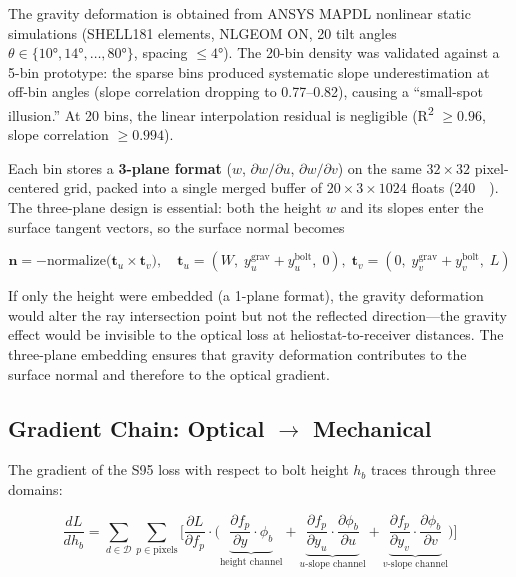 \documentclass{CVM}
\begin{document}
The gravity deformation is obtained from ANSYS MAPDL nonlinear static
simulations (SHELL181 elements, NLGEOM ON, 20 tilt angles
$\theta \in \{10\si{\degree}, 14\si{\degree}, \dots, 80\si{\degree}\}$,
spacing $\le 4\si{\degree}$). The 20-bin density was validated against a
5-bin prototype: the sparse bins produced systematic slope underestimation at
off-bin angles (slope correlation dropping to 0.77--0.82), causing a
``small-spot illusion.'' At 20 bins, the linear interpolation residual is
negligible (R\textsuperscript{2} $\ge 0.96$, slope correlation $\ge 0.994$).

Each bin stores a \textbf{3-plane format}
($w$, $\partial w/\partial u$, $\partial w/\partial v$) on the same
$32\times32$ pixel-centered grid, packed into a single merged buffer of
$20 \times 3 \times 1024$ floats (\SI{240}{\kilo\byte}). The three-plane
design is essential: both the height $w$ and its slopes enter the surface
tangent vectors, so the surface normal becomes

\begin{equation}
\mathbf{n} = -\text{normalize}\big(
\mathbf{t}_u \times \mathbf{t}_v\big),\quad
\mathbf{t}_u = (W,\; y_u^{\text{grav}} + y_u^{\text{bolt}},\; 0),\;
\mathbf{t}_v = (0,\; y_v^{\text{grav}} + y_v^{\text{bolt}},\; L)
\label{eq:normal}
\end{equation}

If only the height were embedded (a 1-plane format), the gravity deformation
would alter the ray intersection point but not the reflected direction---the
gravity effect would be invisible to the optical loss at heliostat-to-receiver
distances. The three-plane embedding ensures that gravity deformation
contributes to the surface normal and therefore to the optical gradient.

\subsection{Gradient Chain: Optical $\rightarrow$ Mechanical}

The gradient of the S95 loss with respect to bolt height $h_b$ traces through
three domains:

\begin{equation}
\frac{dL}{dh_b} = \sum_{d\in\mathcal{D}}\sum_{p\in\text{pixels}}
\Bigg[
\frac{\partial L}{\partial f_p} \cdot \Bigg(
\underbrace{\frac{\partial f_p}{\partial y} \cdot \phi_b}_{\text{height channel}}
+ \underbrace{\frac{\partial f_p}{\partial y_u} \cdot \frac{\partial \phi_b}{\partial u}}_{\text{$u$-slope channel}}
+ \underbrace{\frac{\partial f_p}{\partial y_v} \cdot \frac{\partial \phi_b}{\partial v}}_{\text{$v$-slope channel}}
\Bigg)
\Bigg]
\label{eq:gradient}
\end{equation}
\end{document}
